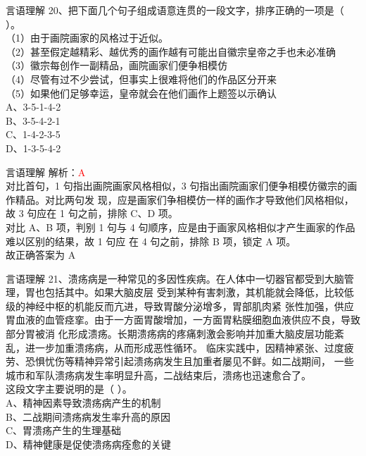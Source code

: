 \documentclass[aspectratio=169]{beamer}
\begin{document}
\begin{frame}[t]{言语理解}
20、把下面几个句子组成语意连贯的一段文字，排序正确的一项是（ ）。\\
（1）由于画院画家的风格过于近似。\\
（2）甚至假定越精彩、越优秀的画作越有可能出自徽宗皇帝之手也未必准确\\
（3）徽宗每创作一副精品，画院画家们便争相模仿\\
（4）尽管有过不少尝试，但事实上很难将他们的作品区分开来\\
（5）如果他们足够幸运，皇帝就会在他们画作上题签以示确认\\
A、3-5-1-4-2\\
B、3-5-4-2-1\\
C、1-4-2-3-5\\
D、1-3-5-4-2\\
\end{frame}



\begin{frame}[t]{言语理解}
    解析：\textcolor{red}{A}\\
对比首句，1 句指出画院画家风格相似，3 句指出画院画家们便争相模仿徽宗的画作精品。对比两句发
现，应是画家们争相模仿一样的画作才导致他们风格相似，故 3 句应在 1 句之前，排除 C、D 项。\\
对比 A、B 项，判别 1 句与 4 句顺序，应是由于画家风格相似才产生画家的作品难以区别的结果，故 1 句应
在 4 句之前，排除 B 项，锁定 A 项。\\
故正确答案为 A
\end{frame}





\begin{frame}[t]{言语理解}
21、溃疡病是一种常见的多因性疾病。在人体中一切器官都受到大脑管理，胃也包括其中。如果大脑皮层
受到某种有害刺激，其机能就会降低，比较低级的神经中枢的机能反而亢进，导致胃酸分泌增多，胃部肌肉紧
张性加强，供应胃血液的血管痉挛。由于一方面胃酸增加，一方面胃粘膜细胞血液供应不良，导致部分胃被消
化形成溃疡。长期溃疡病的疼痛刺激会影响并加重大脑皮层功能紊乱，进一步加重溃疡病，从而形成恶性循环。
临床实践中，因精神紧张、过度疲劳、恐惧忧伤等精神异常引起溃疡病发生且加重者屡见不鲜。如二战期间，
一些城市和军队溃疡病发生率明显升高，二战结束后，溃疡也迅速愈合了。\\
这段文字主要说明的是（ ）。\\
A、精神因素导致溃疡病产生的机制\\
B、二战期间溃疡病发生率升高的原因\\
C、胃溃疡产生的生理基础\\
D、精神健康是促使溃疡病痊愈的关键\\
\end{frame}
\end{document}

